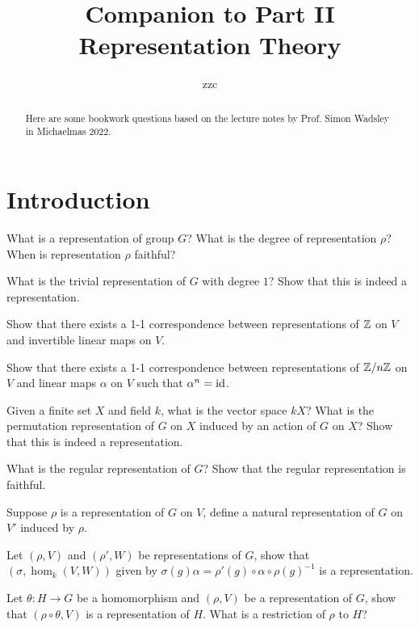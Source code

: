 



\title{Companion to Part II Representation Theory}
\author{zzc}
\maketitle


\rhead{\today}

\begin{abstract}
    Here are some bookwork questions based on the lecture notes by Prof. Simon Wadsley in Michaelmas 2022.
\end{abstract}
\tableofcontents


\section{Introduction}
\begin{question}{1}
   What is a representation of group $G$? What is the degree of representation $\rho$? When is representation $\rho$ faithful?

   What is the trivial representation of $G$ with degree $1$? Show that this is indeed a representation.

   Show that there exists a 1-1 correspondence between representations of $\mathbb{Z}$ on $V$ and invertible linear maps on $V$.

    Show that there exists a 1-1 correspondence between representations of $\mathbb{Z}/n\mathbb{Z}$ on $V$ and linear maps $\alpha$ on $V$ such that $\alpha^n = \text{id}$.
\end{question}

\begin{question}{2}
    Given a finite set $X$ and field $k$, what is the vector space $kX$? What is the permutation representation of $G$ on $X$ induced by an action of $G$ on $X$? Show that this is indeed a representation. 
    
    What is the regular representation of $G$? Show that the regular representation is faithful.

    Suppose $\rho$ is a representation of $G$ on $V$, define a natural representation of $G$ on $V'$ induced by $\rho$.

    Let $(\rho,V)$ and $(\rho',W)$ be representations of $G$, show that $(\sigma, \hom_k(V,W))$ given by $\sigma(g)\alpha = \rho'(g) \circ \alpha \circ \rho(g)^{-1}$ is a representation.
    
    Let $\theta : H \rightarrow G$ be a homomorphism and $(\rho,V)$ be a representation of $G$, show that $(\rho \circ \theta, V)$ is a representation of $H$. What is a restriction of $\rho$ to $H$?
    
\end{question}

